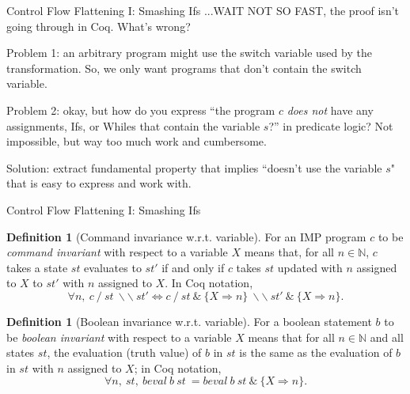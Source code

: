 \documentclass[10pt,handout]{beamer}
\theoremstyle{plain}
\theoremstyle{definition}
\newtheorem{defin}[theo]{Definition}
\newcommand\N{\mathbb{N}}
\begin{document}
\begin{frame}{Control Flow Flattening I: Smashing Ifs}
...WAIT NOT SO FAST, the proof isn't going through in Coq.  What's wrong?\pause\par\medskip
Problem 1: an arbitrary program might use the switch variable used by the transformation.  So, we only want programs that don't contain the switch variable. \pause\par\medskip
Problem 2: okay, but how do you express ``the program $c$ \emph{does not} have any assignments, Ifs, or Whiles that contain the variable $s$?'' in predicate logic?  Not impossible, but way too much work and cumbersome.\pause\par\medskip
Solution: extract fundamental property that implies ``doesn't use the variable $s$" that is easy to express and work with.

\end{frame}

\begin{frame}{Control Flow Flattening I: Smashing Ifs}
\begin{defin}[Command invariance w.r.t. variable]
	For an IMP program $c$ to be \emph{command invariant} with respect to a variable $X$ means that, for all $n\in \N$, $c$ takes a state $st$ evaluates to $st'$ if and only if $c$ takes $st$ updated with $n$ assigned to $X$ to $st'$ with $n$ assigned to $X$.  In Coq notation,
    	\[
        	\forall n,\ c\ /\ st\ \backslash\backslash\ st' \Longleftrightarrow c\ /\ st\ \&\ \{ X \Rightarrow n\}\  \backslash\backslash\ st'\ \&\ \{ X \Rightarrow n\}.
        \]
\end{defin}\pause

\begin{defin}[Boolean invariance w.r.t. variable]
For a boolean statement $b$ to be \emph{boolean invariant} with respect to a variable $X$ means that for all $n\in \N$ and all states $st$, the evaluation (truth value) of $b$ in $st$ is the same as the evaluation of $b$ in $st$ with $n$ assigned to $X$; in Coq notation,
\[
	\forall n,\ st,\ beval\ b\ st\  = beval\ b\ st\ \&\ \{ X \Rightarrow n\}.
\]
\end{defin}
\end{frame}
\end{document}
